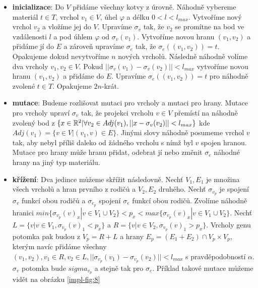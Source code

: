 \begin{itemize}
    \item \textbf{inicializace}: Do $V$ přidáme všechny kotvy z úrovně. Náhodně vybereme materiál $t \in T$, vrchol $v_1 \in V$, úhel $\varphi$ a délku $0 < l < l_{max}$. Vytvoříme nový vrchol $v_2$ a vložíme jej do $V$. Upravíme $\sigma_v$ tak, že $v_2$ se promítne na bod ve vzdálenosti $l$ a pod úhlem $\varphi$ od $\sigma_v(v_1)$. Vytvoříme novou hranu $(v_1, v_2)$ a přidáme jí do $E$ a zároveň upravíme $\sigma_e$ tak, že $\sigma_e((v_1, v_2)) = t$. Opakujeme dokud nevytvoříme $n$ nových vrcholů. Následně náhodně volíme dva vrcholy $v_1, v_2 \in V$. Pokud $||\sigma_v(v_1) - \sigma_v(v_2)|| < l_{max}$ vytvoříme novou hranu $(v_1, v_2)$ a přidáme do $E$. Upravíme $\sigma_e((v_1, v_2)) = t$ pro náhodně zvolené $t \in T$. Opakujeme $2n$-krát.
    \item \textbf{mutace}: Budeme rozlišovat mutaci pro vrcholy a mutaci pro hrany. Mutace pro vrcholy upraví $\sigma_v$ tak, že projekci vrcholu $v \in V$ přemístí na náhodně zvolený bod z $\{ x \in \mathbb{R}^2 | \forall v_2 \in Adj(v_1), ||x - \sigma_v(v_2)|| < l_{max}\}$ kde $Adj(v_1) = \{v \in V | (v_1, v) \in E\}$. Jinými slovy náhodně posumeme vrchol $v$ tak, aby nebyl příliš daleko od žádného vrcholu s nímž byl $v$ spojen hranou. Mutace pro hrany může hranu přidat, odebrat jí nebo změnit $\sigma_e$ náhodné hrany na jiný typ materiálu.
    \item \textbf{křížení}: Dva jedince můžeme skřížit následovně. Nechť $V_1, E_1$ je množina všech vrcholů a hran prvního z rodičů a $V_2, E_2$ druhého. Nechť $\sigma_{v_p}$ je spojení $\sigma_v$ funkcí obou rodičů a $\sigma_{e_p}$ spojení $\sigma_e$ funkcí obou rodičů. Zvolíme náhodně hranici $min\{\sigma_{v_p}(v)_x | v \in V_1 \cup V_2\} < p_x < max\{\sigma_{v_p}(v)_x | v \in V_1 \cup V_2\}$. Nechť $L = \{ v | v \in V_1, \sigma_{v_p}(v)_1 < p_x\}$ a $R = \{ v | v \in V_2, \sigma_{v_p}(v)_1 > p_x\}$. Vrcholy genu potomka pak budou z $V_p = R + L$ a hrany $E_p = (E_1 + E_2) \cap V_p \times V_p$, kterým navíc přidáme všechny $(v_1, v_2), v_1 \in R, v_2 \in L, ||\sigma_{v_p}(v_1) - \sigma_{v_p}(v_2)|| < l_{max}$ s pravděpodobností $\alpha$. $\sigma_v$ potomka bude $sigma_{v_p}$ a stejně tak pro $\sigma_e$. Příklad takové mutace můžeme vidět na obrázku \ref{impl-fig:8}
\end{itemize}


